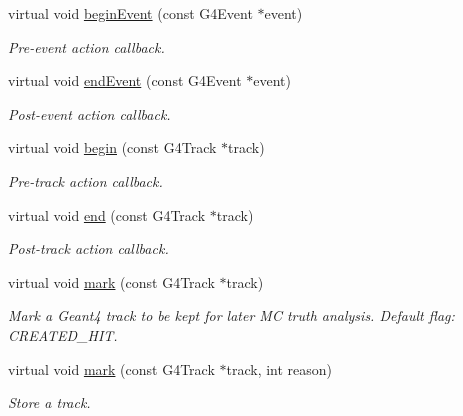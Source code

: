 \begin{DoxyCompactItemize}
virtual void \hyperlink{class_d_d4hep_1_1_simulation_1_1_geant4_particle_handler_adfcc944cca3597fac178ccebbc405a1f}{beginEvent} (const G4Event $\ast$event)
\begin{DoxyCompactList}\small\item\em Pre-\/event action callback. \item\end{DoxyCompactList}\item 
virtual void \hyperlink{class_d_d4hep_1_1_simulation_1_1_geant4_particle_handler_a6b0ac9f15f1c1280ad81ddc1faf3d417}{endEvent} (const G4Event $\ast$event)
\begin{DoxyCompactList}\small\item\em Post-\/event action callback. \item\end{DoxyCompactList}\item 
virtual void \hyperlink{class_d_d4hep_1_1_simulation_1_1_geant4_particle_handler_af967feef838b477f95b5fdd8dd828489}{begin} (const G4Track $\ast$track)
\begin{DoxyCompactList}\small\item\em Pre-\/track action callback. \item\end{DoxyCompactList}\item 
virtual void \hyperlink{class_d_d4hep_1_1_simulation_1_1_geant4_particle_handler_a6983068cd3f90fb922cb89378a85770e}{end} (const G4Track $\ast$track)
\begin{DoxyCompactList}\small\item\em Post-\/track action callback. \item\end{DoxyCompactList}\item 
virtual void \hyperlink{class_d_d4hep_1_1_simulation_1_1_geant4_particle_handler_a50e23a41d610fd19644a8393da13305b}{mark} (const G4Track $\ast$track)
\begin{DoxyCompactList}\small\item\em Mark a Geant4 track to be kept for later MC truth analysis. Default flag: CREATED\_\-HIT. \item\end{DoxyCompactList}\item 
virtual void \hyperlink{class_d_d4hep_1_1_simulation_1_1_geant4_particle_handler_a3ad0a4c70220326e76da4dd79c95501c}{mark} (const G4Track $\ast$track, int reason)
\begin{DoxyCompactList}\small\item\em Store a track. \item\end{DoxyCompactList}\item 

\end{DoxyCompactItemize}
